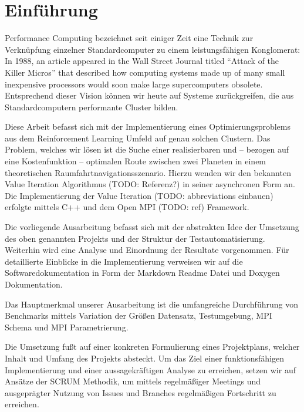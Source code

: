 \section{Einführung}
\label{sec:einfuehrung}
 Performance Computing bezeichnet seit einiger Zeit eine Technik zur Verknüpfung einzelner Standardcomputer zu einem leistungsfähigen Konglomerat: \glqq In 1988, an article appeared in the Wall Street Journal titled ``Attack of the Killer Micros'' that described how computing systems made up of many small inexpensive processors would soon make large supercomputers obsolete.\grqq~\citep[S.~3]{dowd1998high} Entsprechend dieser Vision können wir heute auf Systeme zurückgreifen, die aus Standardcomputern performante Cluster bilden.

Diese Arbeit befasst sich mit der Implementierung eines Optimierungsproblems aus dem Reinforcement Learning Umfeld auf genau solchen Clustern. Das Problem, welches wir lösen ist die Suche einer realisierbaren und -- bezogen auf eine Kostenfunktion -- optimalen Route zwischen zwei Planeten in einem theoretischen Raumfahrtnavigationsszenario. Hierzu wenden wir den bekannten Value Iteration Algorithmus (TODO: Referenz?) in seiner asynchronen Form an. Die Implementierung der Value Iteration (TODO: abbreviations einbauen) erfolgte mittels C++ und dem Open MPI (TODO: ref) Framework.

Die vorliegende Ausarbeitung befasst sich mit der abstrakten Idee der Umsetzung des oben genannten Projekts und der Struktur der Testautomatisierung. Weiterhin wird eine Analyse und Einordnung der Resultate vorgenommen. Für detaillierte Einblicke in die Implementierung verweisen wir auf die Softwaredokumentation in Form der Markdown Readme Datei und Doxygen Dokumentation.

Das Hauptmerkmal unserer Ausarbeitung ist die umfangreiche Durchführung von Benchmarks mittels Variation der Größen Datensatz, Testumgebung, MPI Schema und MPI Parametrierung.

Die Umsetzung fußt auf einer konkreten Formulierung eines Projektplans, welcher Inhalt und Umfang des Projekts absteckt. Um das Ziel einer funktionsfähigen Implementierung und einer aussagekräftigen Analyse zu erreichen, setzen wir auf Ansätze der SCRUM Methodik, um mittels regelmäßiger Meetings und ausgeprägter Nutzung von Issues und Branches regelmäßigen Fortschritt zu erreichen.

